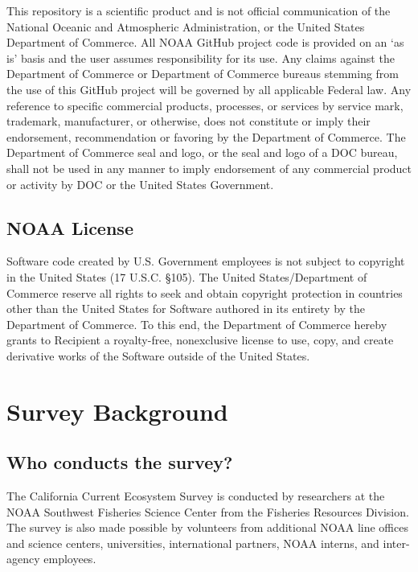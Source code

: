 \documentclass[
  letterpaper,
  oneside,
  open=any]{scrbook}
\begin{document}
This repository is a scientific product and is not official
communication of the National Oceanic and Atmospheric Administration, or
the United States Department of Commerce. All NOAA GitHub project code
is provided on an `as is' basis and the user assumes responsibility for
its use. Any claims against the Department of Commerce or Department of
Commerce bureaus stemming from the use of this GitHub project will be
governed by all applicable Federal law. Any reference to specific
commercial products, processes, or services by service mark, trademark,
manufacturer, or otherwise, does not constitute or imply their
endorsement, recommendation or favoring by the Department of Commerce.
The Department of Commerce seal and logo, or the seal and logo of a DOC
bureau, shall not be used in any manner to imply endorsement of any
commercial product or activity by DOC or the United States Government.

\section*{NOAA License}\label{noaa-license}


Software code created by U.S. Government employees is not subject to
copyright in the United States (17 U.S.C. §105). The United
States/Department of Commerce reserve all rights to seek and obtain
copyright protection in countries other than the United States for
Software authored in its entirety by the Department of Commerce. To this
end, the Department of Commerce hereby grants to Recipient a
royalty-free, nonexclusive license to use, copy, and create derivative
works of the Software outside of the United States.


\chapter{Survey Background}\label{survey-background}

\section{Who conducts the survey?}\label{who-conducts-the-survey}

The California Current Ecosystem Survey is conducted by researchers at
the NOAA Southwest Fisheries Science Center from the Fisheries Resources
Division. The survey is also made possible by volunteers from additional
NOAA line offices and science centers, universities, international
partners, NOAA interns, and inter-agency employees.
\end{document}
